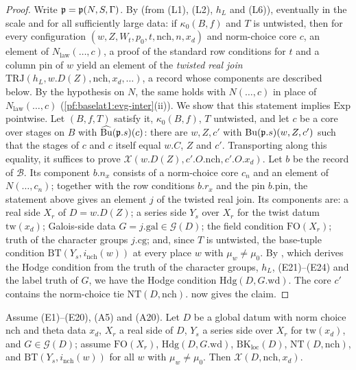 \begin{proof}
Write $\mathfrak p=\mathfrak{p}(N,S,\Gamma)$. By
 (from (L1), (L2), $h_L$ and (L6)), eventually in
the scale and for all sufficiently large data: if $\kappa_0(B,f)$ and $T$ is untwisted, then for every
configuration $(w,Z,W_t,p_0,t,\mathrm{nch},n,x_d)$ and norm-choice core $c$, an element of
$N_{\mathrm{law}}(\dots,c)$, a proof of the standard row conditions for $t$ and a column pin of $w$ yield an element
of the \emph{twisted real join} $\mathrm{TRJ}(h_L,w.D(Z),\mathrm{nch},x_d,\dots)$, a record whose components are
described below.
By the hypothesis on $N$, the same holds with $N(\dots,c)$ in place of $N_{\mathrm{law}}(\dots,c)$
(\cref{pf:baselat1:evg-inter}(ii)). We show that this statement implies $\mathrm{Exp}$ pointwise. Let
$(B,f,T)$ satisfy it, $\kappa_0(B,f)$, $T$ untwisted, and let $c$ be a core over stages on $B$ with
$\widehat{\mathrm{Bu}}(\mathfrak p.s)(c)$: there are $w,Z,c'$ with $\mathrm{Bu}(\mathfrak p.s)(w,Z,c')$
such that the stages of $c$ and $c$ itself equal $w.C$, $Z$ and $c'$. Transporting along this equality, it
suffices to prove $\mathcal{X}(w.D(Z),c'.O.\mathrm{nch},c'.O.x_d)$. Let $b$ be the record of
$\mathcal{B}$. Its component $b.n_x$ consists of a norm-choice core $c_n$ and an element of $N(\dots,c_n)$;
together with the row conditions $b.r_x$ and the pin $b.\mathrm{pin}$, the statement above gives an
element $j$ of the twisted real join. Its components are: a real side $X_r$ of $D=w.D(Z)$; a series side $Y_s$ over
$X_r$ for the twist datum $\mathrm{tw}(x_d)$; Galois-side data $G=j.\mathrm{gal}\in\mathcal{G}(D)$; the
field condition $\mathrm{FO}(X_r)$; truth of the character groups $j.\mathrm{cg}$; and, since $T$ is
untwisted, the base-tuple condition $\mathrm{BT}(Y_s,i_{\mathrm{nch}}(w))$ at every place $w$ with
$\mu_w\ne\mu_0$. By , which derives the Hodge condition from the truth of the
character groups, $h_L$, (E21)--(E24) and the label truth of $G$, we have the Hodge condition
$\mathrm{Hdg}(D,G.\mathrm{wd})$. The core $c'$ contains the norm-choice tie $\mathrm{NT}(D,\mathrm{nch})$.
 now gives the claim.
\end{proof}

\begin{proposition}\label{pf:baselat1:seriesreal}
Assume (E1)--(E20), (A5) and (A20). Let $D$ be a global datum with
norm choice $\mathrm{nch}$ and theta data $x_d$, $X_r$ a real side of $D$, $Y_s$ a series side over $X_r$ for
$\mathrm{tw}(x_d)$, and $G\in\mathcal{G}(D)$; assume $\mathrm{FO}(X_r)$, $\mathrm{Hdg}(D,G.\mathrm{wd})$,
$\mathrm{BK}_{\mathrm{loc}}(D)$, $\mathrm{NT}(D,\mathrm{nch})$, and $\mathrm{BT}(Y_s,i_{\mathrm{nch}}(w))$ for all $w$
with $\mu_w\ne\mu_0$. Then $\mathcal{X}(D,\mathrm{nch},x_d)$.
\end{proposition}

